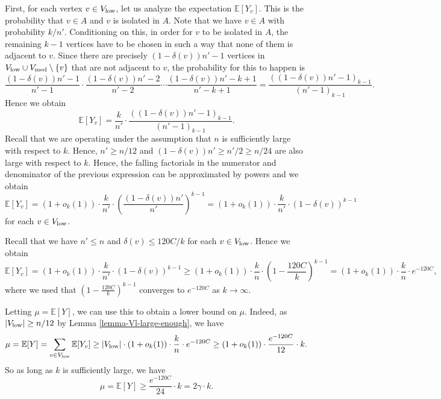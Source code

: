 First, for each vertex $v\in V_{\textnormal{low}}$, let us analyze the expectation $\mathbb{E}[Y_v]$. This is the probability that $v\in A$ and $v$ is isolated in $A$. Note that we have $v\in A$ with probability $k/n'$. Conditioning on this, in order for $v$ to be isolated in $A$, the remaining $k-1$ vertices have to be chosen in such a way that none of them is adjacent to $v$. Since there are precisely $(1-\delta(v))n'-1$ vertices in $V_{\textnormal{low}}\cup V_{\textnormal{med}}\setminus \lbrace v\rbrace$ that are not adjacent to $v$, the probability for this to happen is
\[\frac{(1-\delta(v))n'-1}{n'-1}\cdot \frac{(1-\delta(v))n'-2}{n'-2}\dotsm \frac{(1-\delta(v))n'-k+1}{n'-k+1}=\frac{((1-\delta(v))n'-1)_{k-1}}{(n'-1)_{k-1}}.\]
Hence we obtain
\[\mathbb{E}[Y_v]=\frac{k}{n'}\cdot \frac{((1-\delta(v))n'-1)_{k-1}}{(n'-1)_{k-1}}.\]
Recall that we are operating under the assumption that $n$ is sufficiently large with respect to $k$. Hence, $n'\geq n/12$ and $(1-\delta(v))n'\geq n'/2\geq n/24$ are also large with respect to $k$. Hence, the falling factorials in the numerator and denominator of the previous expression can be approximated by powers and we obtain
\begin{equation}\label{eq-E-Yv}
\mathbb{E}[Y_v]=(1+o_k(1))\cdot \frac{k}{n'}\cdot \left(\frac{(1-\delta(v))n'}{n'}\right)^{k-1}=(1+o_k(1))\cdot \frac{k}{n'}\cdot (1-\delta(v))^{k-1}
\end{equation}
for each $v\in V_{\textnormal{low}}$.

Recall that we have $n'\leq n$ and $\delta(v)\leq 120C/k$ for each $v\in V_{\textnormal{low}}$. Hence we obtain
\[\mathbb{E}[Y_v]=(1+o_k(1))\cdot \frac{k}{n'}\cdot (1-\delta(v))^{k-1}\geq (1+o_k(1))\cdot \frac{k}{n}\cdot \left(1-\frac{120C}{k}\right)^{k-1}=(1+o_k(1))\cdot \frac{k}{n}\cdot e^{-120C},\]
where we used that $\left(1-\frac{120C}{k}\right)^{k-1}$ converges to $e^{-120C}$ as $k\to \infty$.

Letting $\mu=\mathbb{E}[Y]$, we can use this to obtain a lower bound on $\mu$. Indeed, as $\vert V_{\textnormal{low}}\vert\geq n/12$ by Lemma \ref{lemma-Vl-large-enough}, we have
\[\mu=\mathbb{E}[Y]=\sum_{v\in V_{\textnormal{low}}}\mathbb{E}[Y_v]\geq \vert V_{\textnormal{low}}\vert\cdot (1+o_k(1))\cdot \frac{k}{n}\cdot e^{-120C}\geq (1+o_k(1))\cdot \frac{e^{-120C}}{12}\cdot k.\]
So as long as $k$ is sufficiently large, we have
\begin{equation}\label{ineq-mu-lower-bd}
\mu=\mathbb{E}[Y]\geq \frac{e^{-120C}}{24}\cdot k=2\gamma \cdot k.
\end{equation}

